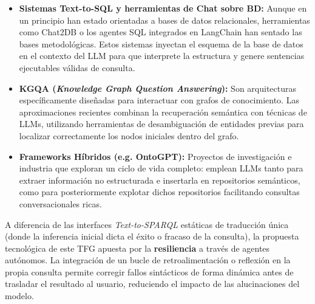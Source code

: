 \begin{itemize}
    \item \textbf{Sistemas Text-to-SQL y herramientas de Chat sobre BD:} Aunque en un principio han estado orientadas a bases de datos relacionales, herramientas como Chat2DB o los agentes SQL integrados en LangChain han sentado las bases metodológicas. Estos sistemas inyectan el esquema de la base de datos en el contexto del LLM para que interprete la estructura y genere sentencias ejecutables válidas de consulta.
    \item \textbf{KGQA (\textit{Knowledge Graph Question Answering}):} Son arquitecturas específicamente diseñadas para interactuar con grafos de conocimiento. Las aproximaciones recientes combinan la recuperación semántica con técnicas de LLMs, utilizando herramientas de desambiguación de entidades previas para localizar correctamente los nodos iniciales dentro del grafo.
    \item \textbf{Frameworks Híbridos (e.g. OntoGPT):} Proyectos de investigación e industria que exploran un ciclo de vida completo: emplean LLMs tanto para extraer información no estructurada e insertarla en repositorios semánticos, como para posteriormente explotar dichos repositorios facilitando consultas conversacionales ricas.
\end{itemize}

A diferencia de las interfaces \textit{Text-to-SPARQL} estáticas de traducción única (donde la inferencia inicial dicta el éxito o fracaso de la consulta), la propuesta tecnológica de este TFG apuesta por la \textbf{resiliencia} a través de agentes autónomos. La integración de un bucle de retroalimentación o reflexión en la propia consulta permite corregir fallos sintácticos de forma dinámica antes de trasladar el resultado al usuario, reduciendo el impacto de las alucinaciones del modelo.